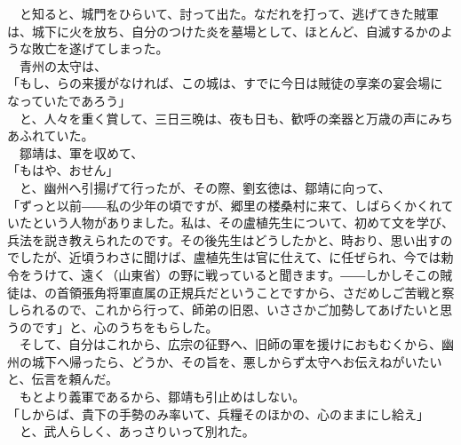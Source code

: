 \documentclass[
  paper=a5,
  fontsize=10pt,
  jafontsize=9.5pt,
  tate,                  %
  open_bracket_pos=nibu, %
]{jlreq}
\begin{document}
　と知ると、城門をひらいて、討って出た。なだれを打って、逃げてきた賊軍は、城下に火を放ち、自分のつけた炎を墓場として、ほとんど、自滅するかのような敗亡を遂げてしまった。\\


　青州の太守は、\\


「もし、らの来援がなければ、この城は、すでに今日は賊徒の享楽の宴会場になっていたであろう」\\


　と、人々を重く賞して、三日三晩は、夜も日も、歓呼の楽器と万歳の声にみちあふれていた。\\


　鄒靖は、軍を収めて、\\


「もはや、おせん」\\


　と、幽州へ引揚げて行ったが、その際、劉玄徳は、鄒靖に向って、\\


「ずっと以前――私の少年の頃ですが、郷里の楼桑村に来て、しばらくかくれていたという人物がありました。私は、その盧植先生について、初めて文を学び、兵法を説き教えられたのです。その後先生はどうしたかと、時おり、思い出すのでしたが、近頃うわさに聞けば、盧植先生は官に仕えて、に任ぜられ、今では勅令をうけて、遠く（山東省）の野に戦っていると聞きます。――しかしそこの賊徒は、の首領張角将軍直属の正規兵だということですから、さだめしご苦戦と察しられるので、これから行って、師弟の旧恩、いささかご加勢してあげたいと思うのです」と、心のうちをもらした。\\


　そして、自分はこれから、広宗の征野へ、旧師の軍を援けにおもむくから、幽州の城下へ帰ったら、どうか、その旨を、悪しからず太守へお伝えねがいたいと、伝言を頼んだ。\\


　もとより義軍であるから、鄒靖も引止めはしない。\\


「しからば、貴下の手勢のみ率いて、兵糧そのほかの、心のままにし給え」\\


　と、武人らしく、あっさりいって別れた。\\

\\
\end{document}
